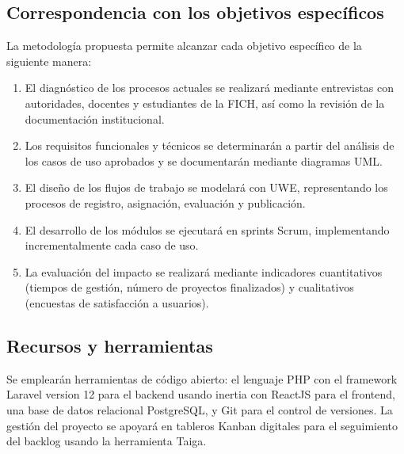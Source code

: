 \subsection{Correspondencia con los objetivos específicos}

La metodología propuesta permite alcanzar cada objetivo específico de la siguiente manera:

\begin{enumerate}
    \item El diagnóstico de los procesos actuales se realizará mediante entrevistas con autoridades, docentes y estudiantes de la FICH, así como la revisión de la documentación institucional.
    \item Los requisitos funcionales y técnicos se determinarán a partir del análisis de los casos de uso aprobados y se documentarán mediante diagramas UML.
    \item El diseño de los flujos de trabajo se modelará con UWE, representando los procesos de registro, asignación, evaluación y publicación.
    \item El desarrollo de los módulos se ejecutará en sprints Scrum, implementando incrementalmente cada caso de uso.
    \item La evaluación del impacto se realizará mediante indicadores cuantitativos (tiempos de gestión, número de proyectos finalizados) y cualitativos (encuestas de satisfacción a usuarios).
\end{enumerate}

\subsection{Recursos y herramientas}

Se emplearán herramientas de código abierto: el lenguaje PHP con el framework Laravel version 12 para el backend usando inertia con ReactJS para el frontend, una base de datos relacional PostgreSQL, y Git para el control de versiones. La gestión del proyecto se apoyará en tableros Kanban digitales para el seguimiento del backlog usando la herramienta Taiga.

\endinput
